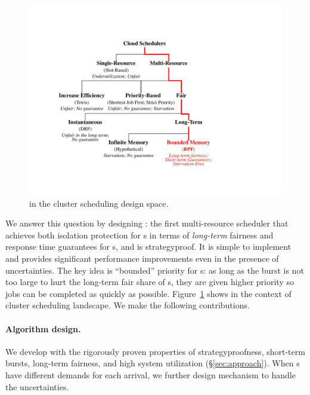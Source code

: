 \begin{figure}[!t]
  \centering
  \includegraphics[width=0.85\linewidth]{fig/Design-Space.pdf}%
  \caption{{\name} in the cluster scheduling design space.}%
  \label{fig:design-space}
  	\vspace{-0.2in}
\end{figure}

We answer this question by designing \name: the first multi-resource scheduler that achieves both isolation protection for {\batchq}s in terms of \emph{long-term} fairness and response time guarantees for {\burstq}s, and is strategyproof. 
It is simple to implement and provides significant performance improvements even in the presence of uncertainties. 
The key idea is ``bounded'' priority for {\burstq}s: as long as the burst is not too large to hurt the long-term fair share of {\batchq}s, they are given higher priority so jobs can be completed as quickly as possible. 
Figure~\ref{fig:design-space} shows \name in the context of cluster scheduling landscape. 
We make the following contributions.

\paragraph{Algorithm design.} We develop \name with the rigorously proven properties of strategyproofness, short-term bursts, long-term fairness, and high system utilization (\S\ref{sec:approach}). When {\burstq}s have different demands for each arrival, we further design mechanism to handle the uncertainties.


